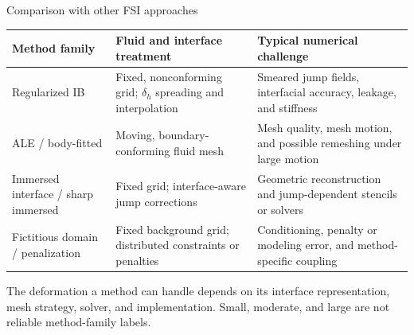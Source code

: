 \documentclass[aspectratio=169,11pt]{beamer}
\begin{document}
\begin{frame}{Comparison with other FSI approaches}
\footnotesize
\renewcommand{\arraystretch}{1.28}
\begin{tabularx}{\textwidth}{@{}>{\raggedright\arraybackslash}p{}>{\raggedright\arraybackslash}p{}>{\raggedright\arraybackslash}X@{}}
\toprule
\textbf{Method family} & \textbf{Fluid and interface treatment} & \textbf{Typical numerical challenge} \\
\midrule
Regularized IB
& Fixed, nonconforming grid; $\delta_h$ spreading and interpolation
& Smeared jump fields, interfacial accuracy, leakage, and stiffness \\
\addlinespace
ALE / body-fitted
& Moving, boundary-conforming fluid mesh
& Mesh quality, mesh motion, and possible remeshing under large motion \\
\addlinespace
Immersed interface / sharp immersed
& Fixed grid; interface-aware jump corrections
& Geometric reconstruction and jump-dependent stencils or solvers \\
\addlinespace
Fictitious domain / penalization
& Fixed background grid; distributed constraints or penalties
& Conditioning, penalty or modeling error, and method-specific coupling \\
\bottomrule
\end{tabularx}
\medskip
\begin{punchbox}
\small The deformation a method can handle depends on its interface representation, mesh strategy, solver, and implementation. Small, moderate, and large are not reliable method-family labels.
\end{punchbox}
\end{frame}
\end{document}
